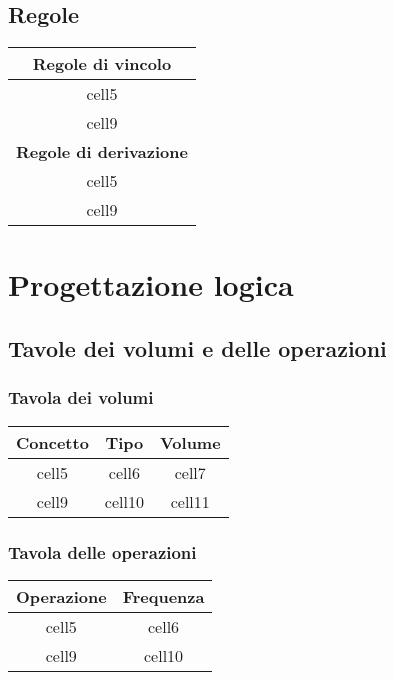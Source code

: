 \documentclass{article}
\begin{document}
\subsection{Regole}
\begin{center}\begin{tabular}{ |c| }
		\hline
		\textbf{Regole di vincolo}     \\
		\hline
		cell5                          \\
		\hline
		cell9                          \\
		\hline
		\textbf{Regole di derivazione} \\
		\hline
		cell5                          \\
		\hline
		cell9                          \\
		\hline
	\end{tabular}\end{center}

\section{Progettazione logica}

\subsection{Tavole dei volumi e delle operazioni}
\subsubsection{Tavola dei volumi}

\begin{center}\begin{tabular}{ |c|c|c| }
		\hline
		\textbf{Concetto} & \textbf{Tipo} & \textbf{Volume} \\
		\hline
		cell5             & cell6         & cell7           \\
		\hline
		cell9             & cell10        & cell11          \\
		\hline
	\end{tabular}\end{center}

\subsubsection{Tavola delle operazioni}

\begin{center}\begin{tabular}{ |c|c| }
		\hline
		\textbf{Operazione} & \textbf{Frequenza} \\
		\hline
		cell5               & cell6              \\
		\hline
		cell9               & cell10             \\
		\hline
	\end{tabular}\end{center}
\end{document}
